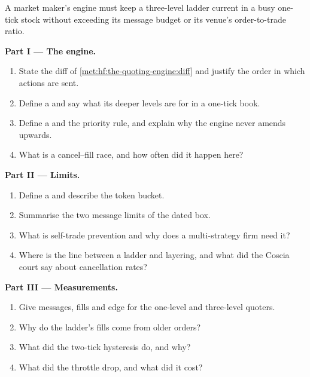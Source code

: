 \begin{problem}\label{pb:hf:the-quoting-engine:1}
A market maker's engine must keep a three-level ladder current in a busy one-tick stock without exceeding its message budget or its venue's
order-to-trade ratio.

\medskip\noindent\textbf{Part I --- The engine.}
\begin{enumerate}
\item State the diff of \cref{met:hf:the-quoting-engine:diff} and justify the order in which actions are sent.
\item Define a  and say what its deeper levels are for in a one-tick book.
\item Define a  and the priority rule, and explain why the engine never amends upwards.
\item What is a cancel--fill race, and how often did it happen here?
\end{enumerate}

\medskip\noindent\textbf{Part II --- Limits.}
\begin{enumerate}[resume]
\item Define a  and describe the token bucket.
\item Summarise the two message limits of the dated box.
\item What is self-trade prevention and why does a multi-strategy firm need it?
\item Where is the line between a ladder and layering, and what did the Coscia court say about cancellation rates?
\end{enumerate}

\medskip\noindent\textbf{Part III --- Measurements.}
\begin{enumerate}[resume]
\item Give messages, fills and edge for the one-level and three-level quoters.
\item Why do the ladder's fills come from older orders?
\item What did the two-tick hysteresis do, and why?
\item What did the throttle drop, and what did it cost?
\end{enumerate}


\end{problem}
